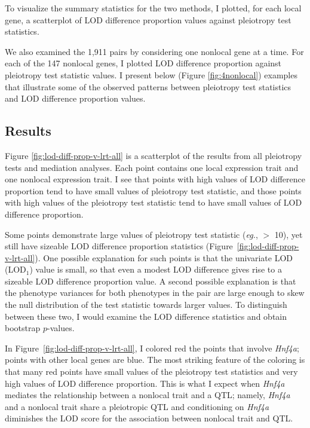 \documentclass[oneside]{book}\usepackage[]{graphicx}\usepackage[]{color}
\begin{document}
To visualize the summary statistics for the two methods, I plotted, 
for each local gene, a scatterplot of LOD difference proportion values 
against pleiotropy test statistics.





We also examined the 1,911 pairs by considering one nonlocal gene at a time.  
For each of the 147 nonlocal genes, I plotted LOD difference proportion 
against pleiotropy test statistic values. 
I present below (Figure \ref{fig:4nonlocal}) examples that illustrate some of the 
observed patterns between pleiotropy test statistics and LOD difference proportion values.


\subsection{Results}

Figure \ref{fig:lod-diff-prop-v-lrt-all} is a scatterplot of the results from all pleiotropy tests and mediation analyses.  
Each point contains one local expression trait and one nonlocal expression trait. 
I see that points with high values of LOD difference proportion tend to have small 
values of pleiotropy test statistic, and those points with high values of the 
pleiotropy test statistic tend to have small values of LOD difference proportion. 

Some points demonstrate large values of pleiotropy test statistic (\emph{eg.}, $>$ 10), 
yet still have sizeable LOD difference proportion statistics (Figure~\ref{fig:lod-diff-prop-v-lrt-all}). 
One possible explanation for such points is that the univariate LOD (LOD$_1$) value is small, 
so that even a modest LOD difference gives rise to a sizeable LOD difference proportion value. 
A second possible explanation is that the phenotype variances for both phenotypes in the pair 
are large enough to skew the null distribution of the test statistic towards larger values. 
To distinguish between these two, I would 
examine the LOD difference statistics and obtain bootstrap $p$-values.

In Figure~\ref{fig:lod-diff-prop-v-lrt-all}, I colored red the points that involve \emph{Hnf4a}; 
points with other local genes are blue. 
The most striking feature of the coloring is that many red points have small 
values of the pleiotropy test statistics and very high values of LOD difference 
proportion. This is what I expect when \emph{Hnf4a} mediates the relationship 
between a nonlocal trait and a QTL; namely, \emph{Hnf4a} and a nonlocal trait 
share a pleiotropic QTL and conditioning on \emph{Hnf4a} diminishes the LOD 
score for the association between nonlocal trait and QTL. 
\end{document}
